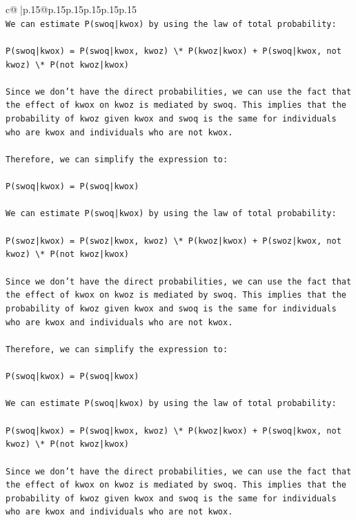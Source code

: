 \documentclass{article}
\begin{document}
{\begin{supertabular}{c@{$\;$}|p{.15\linewidth}@{}p{.15\linewidth}p{.15\linewidth}p{.15\linewidth}p{.15\linewidth}p{.15\linewidth}}
{{{\\ 
\texttt{We can estimate P(swoq|kwox) by using the law of total probability:} \\
\\ 
\texttt{P(swoq|kwox) = P(swoq|kwox, kwoz) \textbackslash{}* P(kwoz|kwox) + P(swoq|kwox, not kwoz) \textbackslash{}* P(not kwoz|kwox)} \\
\\ 
\texttt{Since we don't have the direct probabilities, we can use the fact that the effect of kwox on kwoz is mediated by swoq. This implies that the probability of kwoz given kwox and swoq is the same for individuals who are kwox and individuals who are not kwox.} \\
\\ 
\texttt{Therefore, we can simplify the expression to:} \\
\\ 
\texttt{P(swoq|kwox) = P(swoq|kwox)} \\
\\ 
\texttt{We can estimate P(swoq|kwox) by using the law of total probability:} \\
\\ 
\texttt{P(swoz|kwox) = P(swoz|kwox, kwoz) \textbackslash{}* P(kwoz|kwox) + P(swoz|kwox, not kwoz) \textbackslash{}* P(not kwoz|kwox)} \\
\\ 
\texttt{Since we don't have the direct probabilities, we can use the fact that the effect of kwox on kwoz is mediated by swoq. This implies that the probability of kwoz given kwox and swoq is the same for individuals who are kwox and individuals who are not kwox.} \\
\\ 
\texttt{Therefore, we can simplify the expression to:} \\
\\ 
\texttt{P(swoq|kwox) = P(swoq|kwox)} \\
\\ 
\texttt{We can estimate P(swoq|kwox) by using the law of total probability:} \\
\\ 
\texttt{P(swoq|kwox) = P(swoq|kwox, kwoz) \textbackslash{}* P(kwoz|kwox) + P(swoq|kwox, not kwoz) \textbackslash{}* P(not kwoz|kwox)} \\
\\ 
\texttt{Since we don't have the direct probabilities, we can use the fact that the effect of kwox on kwoz is mediated by swoq. This implies that the probability of kwoz given kwox and swoq is the same for individuals who are kwox and individuals who are not kwox.} \\
}}}
\end{supertabular}}
\end{document}
